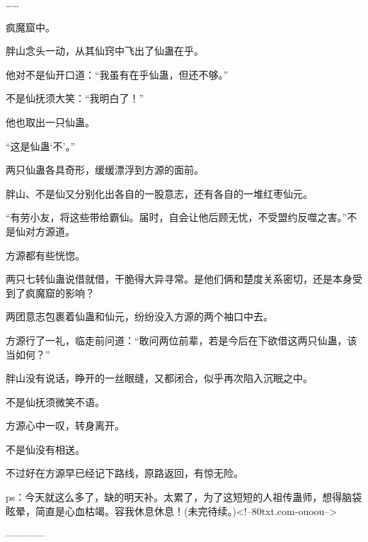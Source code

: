 \begin{this_body}
……

疯魔窟中。

胖山念头一动，从其仙窍中飞出了仙蛊在乎。

他对不是仙开口道：“我虽有在乎仙蛊，但还不够。”

不是仙抚须大笑：“我明白了！”

他也取出一只仙蛊。

“这是仙蛊‘不’。”

两只仙蛊各具奇形，缓缓漂浮到方源的面前。

胖山、不是仙又分别化出各自的一股意志，还有各自的一堆红枣仙元。

“有劳小友，将这些带给霸仙。届时，自会让他后顾无忧，不受盟约反噬之害。”不是仙对方源道。

方源都有些恍惚。

两只七转仙蛊说借就借，干脆得大异寻常。是他们俩和楚度关系密切，还是本身受到了疯魔窟的影响？

两团意志包裹着仙蛊和仙元，纷纷没入方源的两个袖口中去。

方源行了一礼，临走前问道：“敢问两位前辈，若是今后在下欲借这两只仙蛊，该当如何？”

胖山没有说话，睁开的一丝眼缝，又都闭合，似乎再次陷入沉眠之中。

不是仙抚须微笑不语。

方源心中一叹，转身离开。

不是仙没有相送。

不过好在方源早已经记下路线，原路返回，有惊无险。

ps：今天就这么多了，缺的明天补。太累了，为了这短短的人祖传蛊师，想得脑袋眩晕，简直是心血枯竭。容我休息休息！(未完待续。)<!--80txt.com-ouoou-->

------------

\end{this_body}

